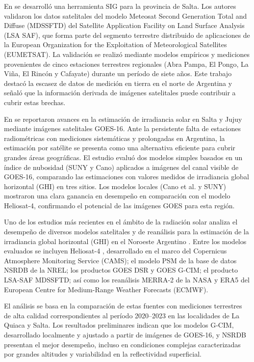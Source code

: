 \documentclass[letterpaper,12pt, twoside]{report}
\providecommand{\DIFdeltex}[1]{{\protect\color{red} \scriptsize #1}} %
\providecommand{\DIFdel}[1]{\texorpdfstring{\DIFdeltex{#1}}{}} %
\begin{document}
\DIFdel{En \cite{SarmientoBarbieri2019} se desarrolló una herramienta SIG para la provincia de Salta. Los autores validaron los datos satelitales del modelo Meteosat Second Generation Total and Diffuse (MDSSFTD) del Satellite Application Facility on Land Surface Analysis (LSA SAF), que forma parte del segmento terrestre distribuido de aplicaciones de la European Organization for the Exploitation of Meteorological Satellites (EUMETSAT). La validación se realizó mediante modelos empíricos y mediciones provenientes de cinco estaciones terrestres regionales (Abra Pampa, El Pongo, La Viña, El Rincón y Cafayate) durante un período de siete años. Este trabajo destacó la escasez de datos de medición en tierra en el norte de Argentina y señaló que la información derivada de imágenes satelitales puede contribuir a cubrir estas brechas.}%

\DIFdel{En \cite{Ledesma2023} se reportaron avances en la estimación de irradiancia solar en Salta y Jujuy mediante imágenes satelitales GOES-16. Ante la persistente falta de estaciones radiométricas con mediciones sistemáticas y prolongadas en Argentina, la estimación por satélite se presenta como una alternativa eficiente para cubrir grandes áreas geográficas. El estudio evaluó dos modelos simples basados en un índice de nubosidad (SUNY y Cano) aplicados a imágenes del canal visible de GOES-16, comparando las estimaciones con valores medidos de irradiancia global horizontal (GHI) en tres sitios. Los modelos locales (Cano et al. y SUNY) mostraron una clara ganancia en desempeño en comparación con el modelo Heliosat-4, confirmando el potencial de las imágenes GOES para esta región.}%

\DIFdel{Uno de los estudios más recientes en el ámbito de la radiación solar analiza el desempeño de diversos modelos satelitales y de reanálisis para la estimación de la irradiancia global horizontal (GHI) en el Noroeste Argentino \cite{Ledesma2025}. Entre los modelos evaluados se incluyen Heliosat-4 \citep{qu2017}, desarrollado en el marco del Copernicus Atmosphere Monitoring Service (CAMS); el modelo PSM de la base de datos NSRDB de la NREL; los productos GOES DSR y GOES G-CIM; el producto LSA-SAF MDSSFTD; así como los reanálisis MERRA-2 de la NASA y ERA5 del European Centre for Medium-Range Weather Forecasts (ECMWF).
}%

\DIFdel{El análisis se basa en la comparación de estas fuentes con mediciones terrestres de alta calidad correspondientes al período 2020--2023 en las localidades de La Quiaca y Salta. Los resultados preliminares indican que los modelos G-CIM, desarrollado localmente y ajustado a partir de imágenes de GOES-16, y NSRDB presentan el mejor desempeño, incluso en condiciones complejas caracterizadas por grandes altitudes y variabilidad en la reflectividad superficial.
}%
\end{document}
